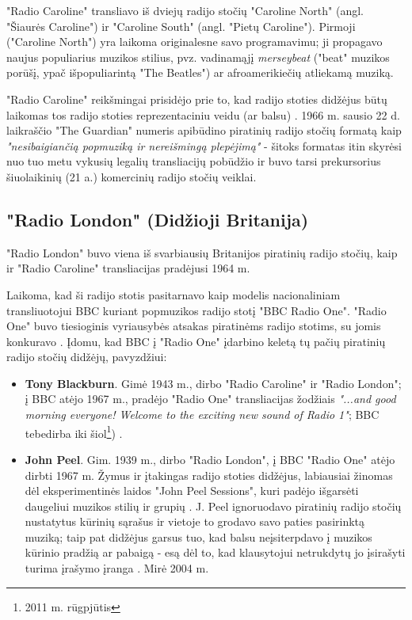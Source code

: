 \documentclass[kursinis-darbas]{vukf}
\begin{document}
"Radio Caroline" transliavo iš dviejų radijo stočių "Caroline North" (angl. "Šiaurės Caroline") ir "Caroline South" (angl. "Pietų Caroline"). Pirmoji ("Caroline North") yra laikoma originalesne savo programavimu; ji propagavo naujus populiarius muzikos stilius, pvz. vadinamąjį \emph{merseybeat} ("beat" muzikos porūšį, ypač išpopuliarintą "The Beatles") ar afroamerikiečių atliekamą muziką.

"Radio Caroline" reikšmingai prisidėjo prie to, kad radijo stoties didžėjus būtų laikomas tos radijo stoties reprezentaciniu veidu (ar balsu) \cite[p.~238]{chs_encyclopedia_of_radio} \cite[p.~447]{js_continuum_encyclopedia}. 1966 m. sausio 22 d. laikraščio "The Guardian" numeris apibūdino piratinių radijo stočių formatą kaip \emph{"nesibaigiančią popmuziką ir nereišmingą plepėjimą"} \cite[p.~447]{js_continuum_encyclopedia} - šitoks formatas itin skyrėsi nuo tuo metu vykusių legalių transliacijų pobūdžio ir buvo tarsi prekursorius šiuolaikinių (21 a.) komercinių radijo stočių veiklai.


\subsection{"Radio London" (Didžioji Britanija)}

"Radio London" buvo viena iš svarbiausių Britanijos piratinių radijo stočių, kaip ir "Radio Caroline" transliacijas pradėjusi 1964 m.

Laikoma, kad ši radijo stotis pasitarnavo kaip modelis nacionaliniam transliuotojui \gls{BBC} kuriant popmuzikos radijo stotį "BBC Radio One". "Radio One" buvo tiesioginis vyriausybės atsakas piratinėms radijo stotims, su jomis konkuravo \cite[p.~238]{chs_encyclopedia_of_radio} \cite[p.~448]{js_continuum_encyclopedia}. Įdomu, kad \gls{BBC} į "Radio One" įdarbino keletą tų pačių piratinių radijo stočių didžėjų, pavyzdžiui:

\begin{itemize}
	\item \textbf{Tony Blackburn}. Gimė 1943 m., dirbo "Radio Caroline" ir "Radio London"; į \gls{BBC} atėjo 1967 m., pradėjo "Radio One" transliacijas žodžiais \emph{"...and good morning everyone! Welcome to the exciting new sound of Radio 1"}; \gls{BBC} tebedirba iki šiol\footnote{2011 m. rūgpjūtis}) \cite{guardian_radio_1_launches}.
	\item \textbf{John Peel}. Gim. 1939 m., dirbo "Radio London", į \gls{BBC} "Radio One" atėjo dirbti 1967 m. Žymus ir įtakingas radijo stoties didžėjus, labiausiai žinomas dėl eksperimentinės laidos "John Peel Sessions", kuri padėjo išgarsėti daugeliui muzikos stilių ir grupių \cite{bbc_john_peel_sessions}. J. Peel ignoruodavo piratinių radijo stočių nustatytus kūrinių sąrašus ir vietoje to grodavo savo paties pasirinktą muziką; taip pat didžėjus garsus tuo, kad balsu neįsiterpdavo į muzikos kūrinio pradžią ar pabaigą - esą dėl to, kad klausytojui netrukdytų jo įsirašyti turima įrašymo įranga \cite[p.~139]{hc_key_concepts_in_radio_studies}. Mirė 2004 m.
\end{itemize}
\end{document}
